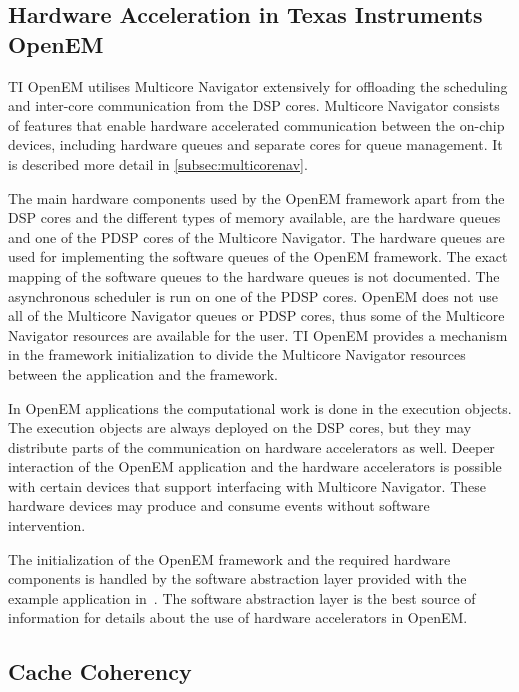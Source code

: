 \subsection{Hardware Acceleration in Texas Instruments OpenEM}
\label{subsec:ti-acceleration}
TI OpenEM utilises Multicore Navigator extensively for offloading the scheduling and inter-core communication from the DSP cores. Multicore Navigator consists of features that enable hardware accelerated communication between the on-chip devices, including hardware queues and separate cores for queue management. It is described more detail in \ref{subsec:multicorenav}.

The main hardware components used by the OpenEM framework apart from the DSP cores and the different types of memory available, are the hardware queues and one of the PDSP cores of the Multicore Navigator. The hardware queues are used for implementing the software queues of the OpenEM framework. The exact mapping of the software queues to the hardware queues is not documented. The asynchronous scheduler is run on one of the PDSP cores. OpenEM does not use all of the Multicore Navigator queues or PDSP cores, thus some of the Multicore Navigator resources are available for the user. TI OpenEM provides a mechanism in the framework initialization to divide the Multicore Navigator resources between the application and the framework.~\cite{openemuser}

In OpenEM applications the computational work is done in the execution objects. The execution objects are always deployed on the DSP cores, but they may distribute parts of the communication on hardware accelerators as well. Deeper interaction of the OpenEM application and the hardware accelerators is possible with certain devices that support interfacing with Multicore Navigator. These hardware devices may produce and consume events without software intervention.~\cite{openemwhite}

The initialization of the OpenEM framework and the required hardware components is handled by the software abstraction layer provided with the example application in~\cite{openemuser}. The software abstraction layer is the best source of information for details about the use of hardware accelerators in OpenEM.

\subsection{Cache Coherency}
\label{subsec:ti-cache-coherency}

